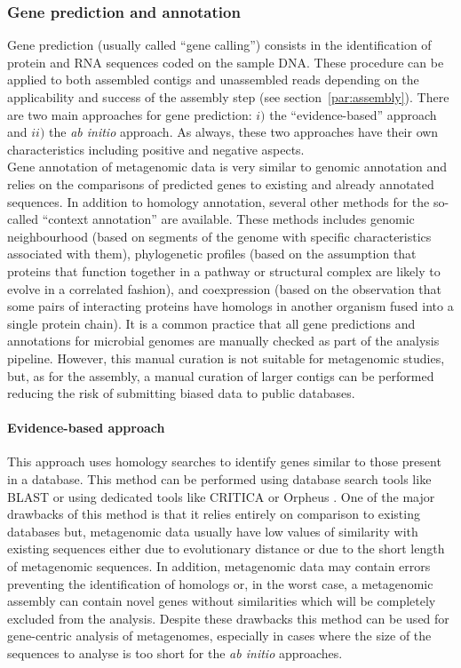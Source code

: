 \subsubsection{Gene prediction and annotation}
Gene prediction (usually called ``gene calling'') consists in the identification of protein and RNA sequences coded on the sample DNA. These procedure can be applied to both assembled contigs and unassembled reads depending on the applicability and success of the assembly step (see section~\ref{par:assembly}). There are two main approaches for gene prediction: $i)$ the ``evidence-based'' approach and $ii)$ the \textit{ab initio} approach. As always, these two approaches have their own characteristics including positive and negative aspects.\\
Gene annotation of metagenomic data is very similar to genomic annotation and relies on the comparisons of predicted genes to existing and already annotated sequences. In addition to homology annotation, several other methods for the so-called ``context annotation'' are available. These methods includes genomic neighbourhood \cite{dandekar1998conservation} (based on segments of the genome with specific characteristics associated with them), phylogenetic profiles \cite{pellegrini1999assigning} (based on the assumption that proteins that function together in a pathway or structural complex are likely to evolve in a correlated fashion), and coexpression \cite{marcotte1999detecting} (based on the observation that some pairs of interacting proteins have homologs in another organism fused into a single protein chain). It is a common practice that all gene predictions and annotations   for microbial genomes are manually checked as part of the analysis pipeline. However, this manual curation is not suitable for metagenomic studies, but, as for the assembly, a manual curation of larger contigs can be performed reducing the risk of submitting biased data to public databases.\\

\paragraph{Evidence-based approach}
This approach uses homology searches to identify genes similar to those present in a database. This method can be performed using database search tools like BLAST \cite{altschul1990basic} or using dedicated tools like CRITICA \cite{badger1999critica} or Orpheus \cite{frishman1998combining}. One of the major drawbacks of this method is that it relies entirely on comparison to existing databases but, metagenomic data usually have low values of similarity with existing sequences either due to evolutionary distance or due to the short length of metagenomic sequences. In addition, metagenomic data may contain errors preventing the identification of homologs or, in the worst case, a metagenomic assembly can contain novel genes without similarities which will be completely excluded from the analysis. Despite these drawbacks this method can be used for gene-centric analysis of metagenomes, especially in cases where the size of the sequences to analyse is too short for the \textit{ab initio} approaches.\\

